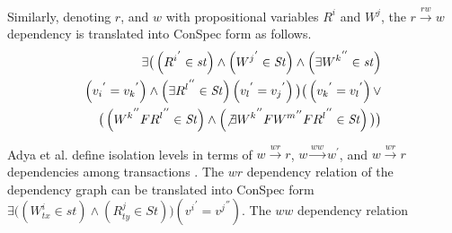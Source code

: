\documentclass{sig-alternate-05-2015}
\begin{document}
   Similarly, denoting  $r$, and $w$ with propositional variables $R^i$ and $W^j$, the
   $r \xrightarrow{rw} w$ dependency is translated into ConSpec form as follows.
     \begin{align}\label{eqn:rw}
\begin{split}
\exists \big( %
\left( {R^i}^{'} \in \mathit{st} \right)
   \wedge \left( {W^j}^{'}  \in  \mathit{St} \right) \wedge
   \left( \exists  {W^k}^{''} \in \mathit{st}  \right) \\
   \left( {v_i}^{'} = {v_k}^{'} \right) \wedge
  \left( \exists {R^l}^{''} \in \mathit{St}  \right) \left( {v_l}^{'} = {v_j}^{'} \right)  \big)
 \big( \left( {v_k}^{'} = {v_l}^{'} \right) \vee \\
  \big(  \left( {W^k}^{''} F { R^l}^{''} \in \mathit{St} \right) \wedge
    \left(  \not\exists {W^k}^{''} F {W^m}^{''} F { R^l}^{''} \in \mathit{St}  \right) \big) \big)
  \end{split}
  \end{align}
   \par Adya et al. define isolation  levels in terms of $w \xrightarrow{wr} r$,
   $w \xrightarrow{ww} w^{'}$, and  $w \xrightarrow{wr} r$  dependencies among transactions
   \cite{DBLP:conf/icde/AdyaLO00}. The $wr$ dependency relation of the dependency graph can be translated into
   ConSpec form \\ $\exists \big( %
   \left( W^i_\mathit{tx} \in \mathit{st} \right)
  \wedge \left(  R^j_\mathit{ty} \in \mathit{St} \right) \big) \left( {v^i}^{'} = {v^j}^{''} \right) $. The $ww$ dependency relation
\end{document}
